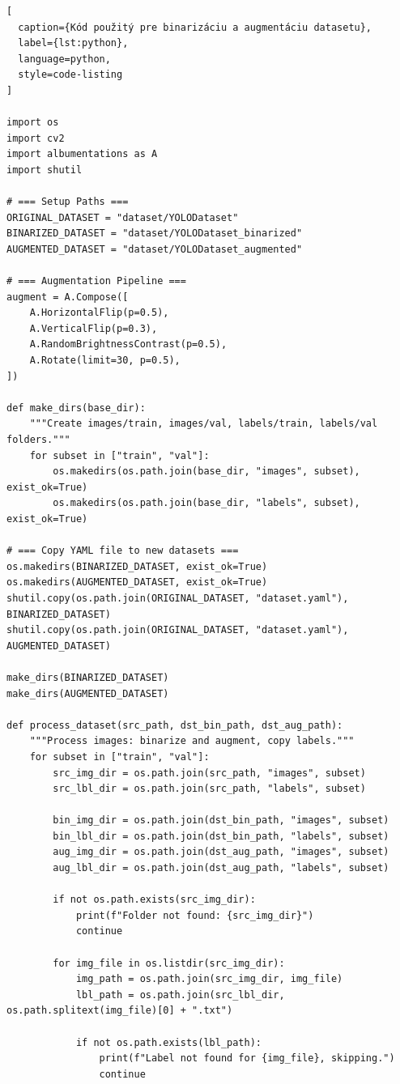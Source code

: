 \begin{lstlisting}[
  caption={Kód použitý pre binarizáciu a augmentáciu datasetu},
  label={lst:python},
  language=python,
  style=code-listing
]

import os
import cv2
import albumentations as A
import shutil

# === Setup Paths ===
ORIGINAL_DATASET = "dataset/YOLODataset"
BINARIZED_DATASET = "dataset/YOLODataset_binarized"
AUGMENTED_DATASET = "dataset/YOLODataset_augmented"

# === Augmentation Pipeline ===
augment = A.Compose([
    A.HorizontalFlip(p=0.5),
    A.VerticalFlip(p=0.3),
    A.RandomBrightnessContrast(p=0.5),
    A.Rotate(limit=30, p=0.5),
])

def make_dirs(base_dir):
    """Create images/train, images/val, labels/train, labels/val folders."""
    for subset in ["train", "val"]:
        os.makedirs(os.path.join(base_dir, "images", subset), exist_ok=True)
        os.makedirs(os.path.join(base_dir, "labels", subset), exist_ok=True)

# === Copy YAML file to new datasets ===
os.makedirs(BINARIZED_DATASET, exist_ok=True)
os.makedirs(AUGMENTED_DATASET, exist_ok=True)
shutil.copy(os.path.join(ORIGINAL_DATASET, "dataset.yaml"), BINARIZED_DATASET)
shutil.copy(os.path.join(ORIGINAL_DATASET, "dataset.yaml"), AUGMENTED_DATASET)

make_dirs(BINARIZED_DATASET)
make_dirs(AUGMENTED_DATASET)

def process_dataset(src_path, dst_bin_path, dst_aug_path):
    """Process images: binarize and augment, copy labels."""
    for subset in ["train", "val"]:
        src_img_dir = os.path.join(src_path, "images", subset)
        src_lbl_dir = os.path.join(src_path, "labels", subset)

        bin_img_dir = os.path.join(dst_bin_path, "images", subset)
        bin_lbl_dir = os.path.join(dst_bin_path, "labels", subset)
        aug_img_dir = os.path.join(dst_aug_path, "images", subset)
        aug_lbl_dir = os.path.join(dst_aug_path, "labels", subset)

        if not os.path.exists(src_img_dir):
            print(f"Folder not found: {src_img_dir}")
            continue

        for img_file in os.listdir(src_img_dir):
            img_path = os.path.join(src_img_dir, img_file)
            lbl_path = os.path.join(src_lbl_dir, os.path.splitext(img_file)[0] + ".txt")

            if not os.path.exists(lbl_path):
                print(f"Label not found for {img_file}, skipping.")
                continue


\end{lstlisting}
